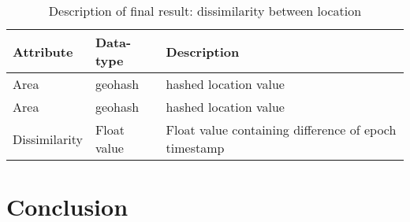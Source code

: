 \documentclass[paper=letter, fontsize=12pt]{article}
\begin{document}
\begin{table}[H]
	\centering
	\renewcommand{\arraystretch}{1.5}
	\begin{tabular}{l | l | l}
		Attribute & Data-type & Description
		\\ \hline \hline
		Area & geohash & hashed location value
		\\ \hline
		Area & geohash & hashed location value
		\\ \hline
		Dissimilarity & Float value & Float value containing difference of epoch timestamp
	\end{tabular}
	\caption{Description of final result: dissimilarity between location}
\end{table}

\section{Conclusion}
\end{document}
